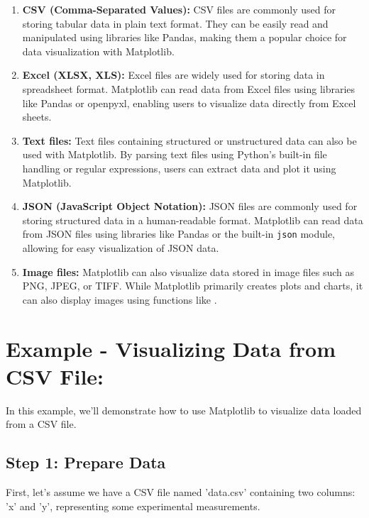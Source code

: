 \begin{enumerate}
	\item \textbf{CSV (Comma-Separated Values):} CSV files are commonly used for storing tabular data in plain text format. They can be easily read and manipulated using libraries like Pandas, making them a popular choice for data visualization with Matplotlib.
	
	\item \textbf{Excel (XLSX, XLS):} Excel files are widely used for storing data in spreadsheet format. Matplotlib can read data from Excel files using libraries like Pandas or openpyxl, enabling users to visualize data directly from Excel sheets.
	
	\item \textbf{Text files:} Text files containing structured or unstructured data can also be used with Matplotlib. By parsing text files using Python's built-in file handling or regular expressions, users can extract data and plot it using Matplotlib.
	
	\item \textbf{JSON (JavaScript Object Notation):} JSON files are commonly used for storing structured data in a human-readable format. Matplotlib can read data from JSON files using libraries like Pandas or the built-in \texttt{json} module, allowing for easy visualization of JSON data.
	
	\item \textbf{Image files:} Matplotlib can also visualize data stored in image files such as PNG, JPEG, or TIFF. While Matplotlib primarily creates plots and charts, it can also display images using functions like . \cite{Rougier:2021}
\end{enumerate}

\section*{Example - Visualizing Data from CSV File:}

In this example, we'll demonstrate how to use Matplotlib to visualize data loaded from a CSV file.

\subsection*{Step 1: Prepare Data}

First, let's assume we have a CSV file named 'data.csv' containing two columns: 'x' and 'y', representing some experimental measurements.

